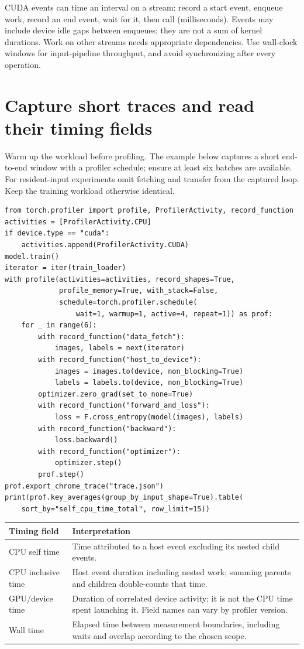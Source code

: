 \documentclass[11pt,a4paper,oneside]{report}
\newcommand{\code}[1]{\texttt{\detokenize{#1}}}
\begin{document}
CUDA events can time an interval on a stream: record a start event, enqueue
work, record an end event, wait for it, then call
\code{start.elapsed_time(end)} (milliseconds). Events may include device idle
gaps between enqueues; they are not a sum of kernel durations. Work on other
streams needs appropriate dependencies. Use wall-clock windows for input-pipeline
throughput, and avoid synchronizing after every operation.

\newpage
\section{Capture short traces and read their timing fields}
Warm up the workload before profiling. The example below captures a short
end-to-end window with a profiler schedule; ensure at least six batches are
available. For resident-input experiments omit fetching and transfer from the
captured loop. Keep the training workload otherwise identical.

\begin{lstlisting}[style=python]
from torch.profiler import profile, ProfilerActivity, record_function
activities = [ProfilerActivity.CPU]
if device.type == "cuda":
    activities.append(ProfilerActivity.CUDA)
model.train()
iterator = iter(train_loader)
with profile(activities=activities, record_shapes=True,
             profile_memory=True, with_stack=False,
             schedule=torch.profiler.schedule(
                 wait=1, warmup=1, active=4, repeat=1)) as prof:
    for _ in range(6):
        with record_function("data_fetch"):
            images, labels = next(iterator)
        with record_function("host_to_device"):
            images = images.to(device, non_blocking=True)
            labels = labels.to(device, non_blocking=True)
        optimizer.zero_grad(set_to_none=True)
        with record_function("forward_and_loss"):
            loss = F.cross_entropy(model(images), labels)
        with record_function("backward"):
            loss.backward()
        with record_function("optimizer"):
            optimizer.step()
        prof.step()
prof.export_chrome_trace("trace.json")
print(prof.key_averages(group_by_input_shape=True).table(
    sort_by="self_cpu_time_total", row_limit=15))
\end{lstlisting}

\begin{tabularx}{\textwidth}{@{}lY@{}}
\toprule
Timing field & Interpretation\\\midrule
CPU self time & Time attributed to a host event excluding its nested child events.\\
CPU inclusive time & Host event duration including nested work; summing parents and
children double-counts that time.\\
GPU/device time & Duration of correlated device activity; it is not the CPU time
spent launching it. Field names can vary by profiler version.\\
Wall time & Elapsed time between measurement boundaries, including waits and
overlap according to the chosen scope.\\
\bottomrule
\end{tabularx}
\end{document}
